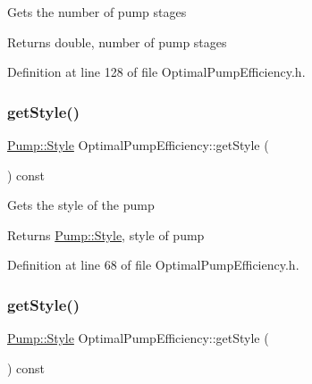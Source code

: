 Gets the number of pump stages

\begin{DoxyReturn}{Returns}
double, number of pump stages 
\end{DoxyReturn}


Definition at line 128 of file Optimal\+Pump\+Efficiency.\+h.

\mbox{\label{class_optimal_pump_efficiency_a601fe15e9acc23112743fabe417030fb}} 
\subsubsection{\texorpdfstring{get\+Style()}{getStyle()}\hspace{0.1cm}{\footnotesize\ttfamily [1/3]}}
{\footnotesize\ttfamily \hyperlink{class_pump_aef354601ce4218258cc898b35a1e90ff}{Pump\+::\+Style} Optimal\+Pump\+Efficiency\+::get\+Style (\begin{DoxyParamCaption}{ }\end{DoxyParamCaption}) const\hspace{0.3cm}{\ttfamily [inline]}}

Gets the style of the pump

\begin{DoxyReturn}{Returns}
\hyperlink{class_pump_aef354601ce4218258cc898b35a1e90ff}{Pump\+::\+Style}, style of pump 
\end{DoxyReturn}


Definition at line 68 of file Optimal\+Pump\+Efficiency.\+h.

\mbox{\label{class_optimal_pump_efficiency_a601fe15e9acc23112743fabe417030fb}} 
\subsubsection{\texorpdfstring{get\+Style()}{getStyle()}\hspace{0.1cm}{\footnotesize\ttfamily [2/3]}}
{\footnotesize\ttfamily \hyperlink{class_pump_aef354601ce4218258cc898b35a1e90ff}{Pump\+::\+Style} Optimal\+Pump\+Efficiency\+::get\+Style (\begin{DoxyParamCaption}{ }\end{DoxyParamCaption}) const\hspace{0.3cm}{\ttfamily [inline]}}

